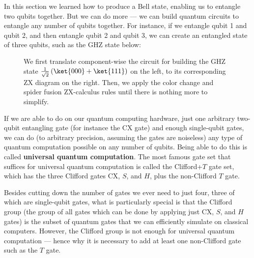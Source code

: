 \documentclass{article}
\theoremstyle{definition}
\begin{document}
\begin{note}
	In this section we learned how to produce a Bell state, enabling us to entangle two qubits together.  But we can do more --- we can build quantum circuits to entangle any number of qubits together.  For instance, if we entangle qubit 1 and qubit 2, and then entangle qubit 2 and qubit 3, we can create an entangled state of three qubits, such as the GHZ state below:

	\begin{figure}[H]
		\raggedleft
		\begin{minipage}[r]{0.4\linewidth}
			\vspace{0.5em}
		\end{minipage}
		\begin{minipage}[l]{0.5\linewidth}
			\begin{frame}{}
			\end{frame}
		\end{minipage}
		\vspace{-1em}
		\caption{\small{\label{fig:ghz-state}We first translate component-wise the circuit for building the GHZ state $\frac{1}{\sqrt{2}} \left(\ket{000} + \ket{111}\right)$ on the left, to its corresponding ZX diagram on the right.  Then, we apply the color change and spider fusion ZX-calculus rules until there is nothing more to simplify.}}
		\end{figure}

	If we are able to do on our quantum computing hardware, just one arbitrary two-qubit entangling gate (for instance the CX gate) and enough single-qubit gates, we can do (to arbitrary precision, assuming the gates are noiseless) any type of quantum computation possible on any number of qubits.  Being able to do this is called \textbf{universal quantum computation}.  The most famous gate set that suffices for universal quantum computation is called the Clifford+$T$ gate set, which has the three Clifford gates CX, $S$, and $H$, plus the non-Clifford $T$ gate.

	Besides cutting down the number of gates we ever need to just four, three of which are single-qubit gates, what is particularly special is that the Clifford group (the group of all gates which can be done by applying just CX, $S$, and $H$ gates) is the subset of quantum gates that we can efficiently simulate on classical computers.  However, the Clifford group is not enough for universal quantum computation --- hence why it is necessary to add at least one non-Clifford gate such as the $T$ gate.
\end{note}
\end{document}
